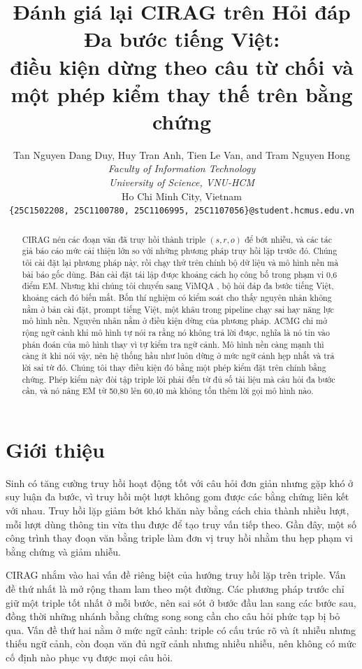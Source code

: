 \documentclass[11pt]{article}
\title{Đánh giá lại CIRAG trên Hỏi đáp Đa bước tiếng Việt:\\
       điều kiện dừng theo câu từ chối và một phép kiểm thay thế trên bằng chứng}
\author{
  Tan Nguyen Dang Duy, Huy Tran Anh, Tien Le Van, and Tram Nguyen Hong \\
  \textit{Faculty of Information Technology} \\
  \textit{University of Science, VNU-HCM} \\
  Ho Chi Minh City, Vietnam \\
  \texttt{\{25C1502208, 25C1100780, 25C1106995, 25C1107056\}@student.hcmus.edu.vn}
}
\begin{document}
\maketitle

\begin{abstract}
CIRAG \citep{wei2026cirag} nén các đoạn văn đã truy hồi thành triple $(s,r,o)$ để bớt nhiễu,
và các tác giả báo cáo mức cải thiện lớn so với những phương pháp truy hồi lặp trước đó.
Chúng tôi cài đặt lại phương pháp này, rồi chạy thử trên chính bộ dữ liệu và mô hình nền mà
bài báo gốc dùng. Bản cài đặt tái lập được khoảng cách họ công bố trong phạm vi 0,6 điểm EM.
Nhưng khi chúng tôi chuyển sang ViMQA \citep{le2022vimqa}, bộ hỏi đáp đa bước tiếng Việt,
khoảng cách đó biến mất. Bốn thí nghiệm có kiểm soát cho thấy nguyên nhân không nằm ở bản
cài đặt, prompt tiếng Việt, một khâu trong pipeline chạy sai hay năng lực mô hình nền. Nguyên
nhân nằm ở điều kiện dừng của phương pháp. ACMG chỉ mở rộng ngữ cảnh khi mô hình tự nói ra
rằng nó không trả lời được, nghĩa là nó tin vào phán đoán của mô hình thay vì tự kiểm tra
ngữ cảnh. Mô
hình nền càng mạnh thì càng ít khi nói vậy, nên hệ thống hầu như luôn dừng ở mức ngữ cảnh
hẹp nhất và trả lời sai từ đó. Chúng tôi
thay điều kiện đó bằng một phép kiểm đặt trên chính bằng chứng. Phép kiểm này đòi tập triple
lõi phải đến từ đủ số tài liệu mà câu hỏi đa bước cần, và nó nâng EM từ 50,80 lên 60,40
mà không tốn thêm lời gọi mô hình nào.
\end{abstract}

\section{Giới thiệu}
\label{sec:intro}

Sinh có tăng cường truy hồi \citep{lewis2020rag} hoạt động tốt với câu hỏi đơn giản nhưng
gặp khó ở suy luận đa bước, vì truy hồi một lượt không gom được các bằng chứng liên kết với
nhau. Truy hồi lặp \citep{trivedi2023ircot} giảm bớt khó khăn này bằng cách chia thành nhiều
lượt, mỗi lượt dùng thông tin vừa thu được để tạo truy vấn tiếp theo. Gần đây, một số công
trình thay đoạn văn bằng triple làm đơn vị truy hồi \citep{fang2024trace, fang2025kirag}
nhằm thu hẹp phạm vi bằng chứng và giảm nhiễu.

CIRAG \citep{wei2026cirag} nhắm vào hai vấn đề riêng biệt của hướng truy hồi lặp trên
triple. Vấn đề thứ nhất là mở rộng tham lam theo một đường. Các phương pháp trước chỉ giữ một
triple tốt nhất ở mỗi bước, nên sai sót ở bước đầu lan sang các bước sau, đồng thời những
nhánh bằng chứng song song cần cho câu hỏi phức tạp bị bỏ qua. Vấn đề thứ hai nằm ở
mức ngữ cảnh: triple có cấu trúc rõ và ít nhiễu nhưng thiếu ngữ cảnh, còn đoạn văn đủ ngữ
cảnh nhưng nhiều nhiễu, nên không có mức cố định nào phục vụ được mọi câu hỏi.
\end{document}
